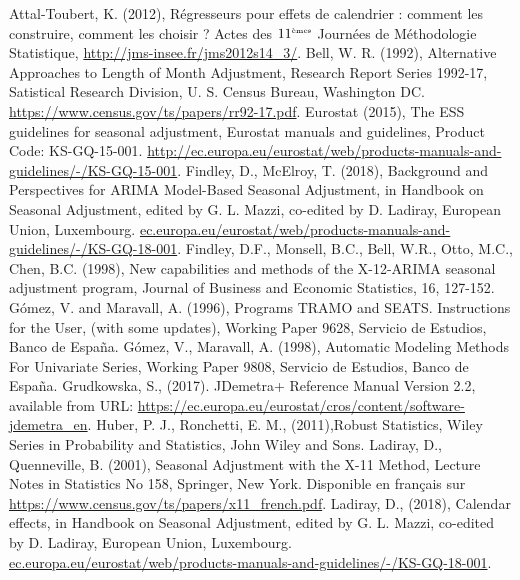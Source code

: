 \documentclass[12pt, a4paper, french]{article}
\begin{document}
\newpage
 
\nocite{*}
\begin{thebibliography}{999}
 Attal-Toubert, K. (2012), Régresseurs pour effets de calendrier : comment les construire, comment les choisir ? Actes des $11^{\mbox{\tiny èmes}}$ Journées de Méthodologie Statistique, \url{http://jms-insee.fr/jms2012s14_3/}.
 Bell, W. R. (1992), Alternative Approaches to Length of Month Adjustment, Research Report Series 1992-17, Satistical Research Division, U. S. Census Bureau, Washington DC. \url{https://www.census.gov/ts/papers/rr92-17.pdf}.
 Eurostat (2015), The ESS guidelines for seasonal adjustment, Eurostat manuals and guidelines, Product Code: KS-GQ-15-001. \url{http://ec.europa.eu/eurostat/web/products-manuals-and-guidelines/-/KS-GQ-15-001}.
 Findley, D., McElroy, T. (2018), Background and Perspectives for ARIMA Model-Based Seasonal Adjustment, in Handbook on Seasonal Adjustment, edited by G. L. Mazzi, co-edited by D. Ladiray, European Union, Luxembourg. \url{ec.europa.eu/eurostat/web/products-manuals-and-guidelines/-/KS-GQ-18-001}.
 Findley, D.F., Monsell, B.C., Bell, W.R., Otto, M.C., Chen, B.C. (1998), New capabilities and methods of the X-12-ARIMA seasonal adjustment program, Journal of Business and Economic Statistics, 16, 127-152.
 G\'{o}mez, V. and Maravall, A. (1996), Programs TRAMO and SEATS. Instructions for the User, (with some updates), Working Paper 9628, Servicio de Estudios, Banco de Espa\~{n}a.
 G\'{o}mez, V., Maravall, A. (1998), Automatic Modeling Methods For Univariate Series, Working Paper 9808, Servicio de Estudios, Banco de Espa\~{n}a.
 	Grudkowska, S., (2017).	JDemetra+ Reference Manual Version 2.2, available from URL: \url{https://ec.europa.eu/eurostat/cros/content/software-jdemetra_en}.
 Huber, P. J., Ronchetti, E. M., (2011),Robust Statistics, Wiley Series in Probability and Statistics, John Wiley and Sons.
 Ladiray, D., Quenneville, B. (2001), Seasonal Adjustment with the X-11 Method, Lecture Notes in Statistics No 158, Springer, New York. Disponible en français sur \url{https://www.census.gov/ts/papers/x11_french.pdf}.
 Ladiray, D., (2018), Calendar effects, in Handbook on Seasonal Adjustment, edited by G. L. Mazzi, co-edited by D. Ladiray, European Union, Luxembourg. \url{ec.europa.eu/eurostat/web/products-manuals-and-guidelines/-/KS-GQ-18-001}.

\end{thebibliography}
\end{document}
